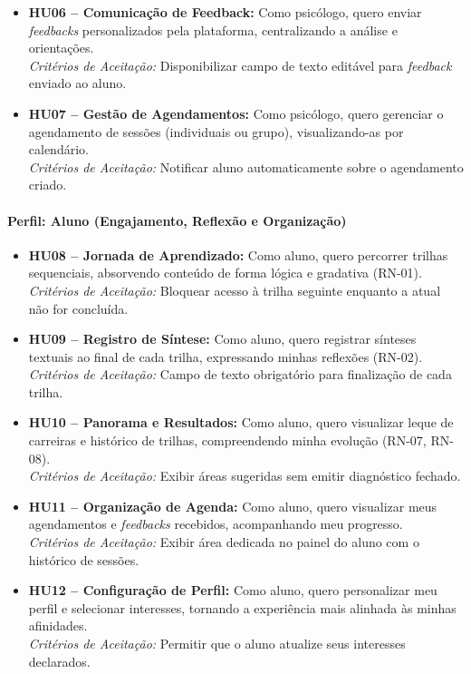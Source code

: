 \begin{itemize}
    \item \textbf{HU06 -- Comunicação de Feedback:} Como psicólogo, quero enviar \textit{feedbacks} personalizados pela plataforma, centralizando a análise e orientações. \\
    \textit{Critérios de Aceitação:} Disponibilizar campo de texto editável para \textit{feedback} enviado ao aluno.

    \item \textbf{HU07 -- Gestão de Agendamentos:} Como psicólogo, quero gerenciar o agendamento de sessões (individuais ou grupo), visualizando-as por calendário. \\
    \textit{Critérios de Aceitação:} Notificar aluno automaticamente sobre o agendamento criado.
\end{itemize}

\paragraph{Perfil: Aluno (Engajamento, Reflexão e Organização)}

\begin{itemize}
    \item \textbf{HU08 -- Jornada de Aprendizado:} Como aluno, quero percorrer trilhas sequenciais, absorvendo conteúdo de forma lógica e gradativa (RN-01). \\
    \textit{Critérios de Aceitação:} Bloquear acesso à trilha seguinte enquanto a atual não for concluída.

    \item \textbf{HU09 -- Registro de Síntese:} Como aluno, quero registrar sínteses textuais ao final de cada trilha, expressando minhas reflexões (RN-02). \\
    \textit{Critérios de Aceitação:} Campo de texto obrigatório para finalização de cada trilha.

    \item \textbf{HU10 -- Panorama e Resultados:} Como aluno, quero visualizar leque de carreiras e histórico de trilhas, compreendendo minha evolução (RN-07, RN-08). \\
    \textit{Critérios de Aceitação:} Exibir áreas sugeridas sem emitir diagnóstico fechado.

    \item \textbf{HU11 -- Organização de Agenda:} Como aluno, quero visualizar meus agendamentos e \textit{feedbacks} recebidos, acompanhando meu progresso. \\
    \textit{Critérios de Aceitação:} Exibir área dedicada no painel do aluno com o histórico de sessões.

    \item \textbf{HU12 -- Configuração de Perfil:} Como aluno, quero personalizar meu perfil e selecionar interesses, tornando a experiência mais alinhada às minhas afinidades. \\
    \textit{Critérios de Aceitação:} Permitir que o aluno atualize seus interesses declarados.
\end{itemize}

